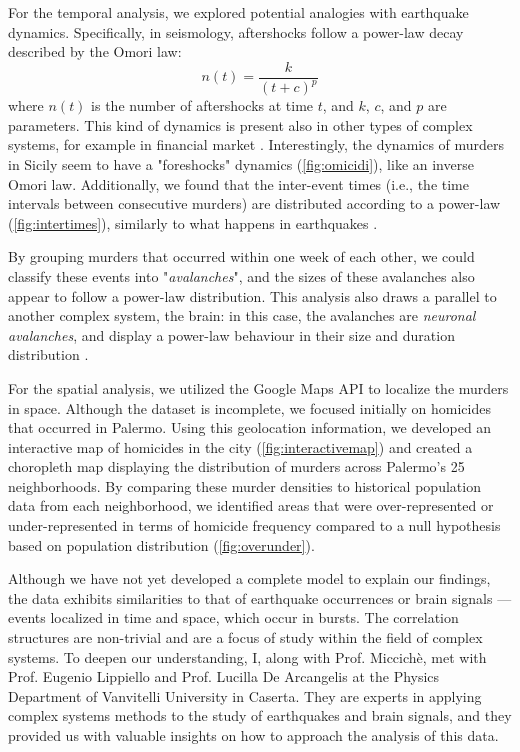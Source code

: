 \documentclass[a4paper, 10pt]{scrartcl}
\begin{document}
For the temporal analysis, we explored potential analogies with earthquake dynamics. Specifically, in seismology, aftershocks follow a power-law decay described by the Omori law:
\begin{equation}
  n(t) = \frac{k}{(t+c)^p}
\end{equation}
where \(n(t)\) is the number of aftershocks at time \(t\), and \(k\), \(c\), and \(p\) are parameters. This kind of dynamics is present also in other types of complex systems, for example in financial market \cite{lillo_power-law_2003}. Interestingly, the dynamics of murders in Sicily seem to have a "foreshocks" dynamics (\autoref{fig:omicidi}), like an inverse Omori law. Additionally, we found that the inter-event times (i.e., the time intervals between consecutive murders) are distributed according to a power-law (\autoref{fig:intertimes}), similarly to what happens in earthquakes \cite{lippiello_scaling_2012}.

By grouping murders that occurred within one week of each other, we could classify these events into "\textit{avalanches}", and the sizes of these avalanches also appear to follow a power-law distribution. This analysis also draws a parallel to another complex system, the brain: in this case, the avalanches are \textit{neuronal avalanches}, and display a power-law behaviour in their size and duration distribution \cite{lombardi_temporal_2014}.



For the spatial analysis, we utilized the Google Maps API to localize the murders in space. Although the dataset is incomplete, we focused initially on homicides that occurred in Palermo. Using this geolocation information, we developed an interactive map of homicides in the city (\autoref{fig:interactivemap}) and created a choropleth map displaying the distribution of murders across Palermo's 25 neighborhoods.
By comparing these murder densities to historical population data from each neighborhood, we identified areas that were over-represented or under-represented in terms of homicide frequency compared to a null hypothesis based on population distribution (\autoref{fig:overunder}).



Although we have not yet developed a complete model to explain our findings, the data exhibits similarities to that of earthquake occurrences or brain signals — events localized in time and space, which occur in bursts. The correlation structures are non-trivial and are a focus of study within the field of complex systems. To deepen our understanding, I, along with Prof. Miccichè, met with Prof. Eugenio Lippiello and Prof. Lucilla De Arcangelis at the Physics Department of Vanvitelli University in Caserta. They are experts in applying complex systems methods to the study of earthquakes and brain signals, and they provided us with valuable insights on how to approach the analysis of this data.
\end{document}
